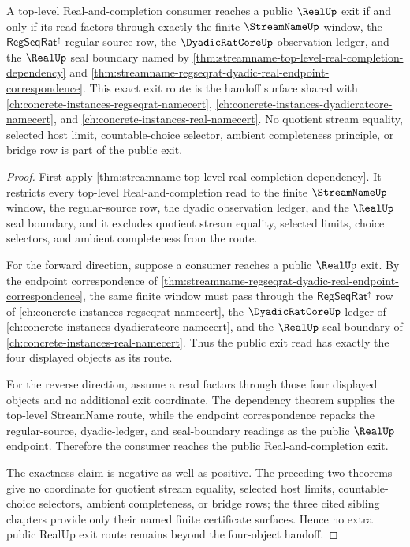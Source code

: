 \begin{theorem}
\label{thm:streamname-four-object-exit-exactness}
A top-level Real-and-completion consumer reaches a public $\RealUp$ exit if and only if its read factors through exactly the finite $\StreamNameUp$ window, the $\mathsf{RegSeqRat}^{\uparrow}$ regular-source row, the $\DyadicRatCoreUp$ observation ledger, and the $\RealUp$ seal boundary named by \autoref{thm:streamname-top-level-real-completion-dependency} and \autoref{thm:streamname-regseqrat-dyadic-real-endpoint-correspondence}. This exact exit route is the handoff surface shared with \autoref{ch:concrete-instances-regseqrat-namecert}, \autoref{ch:concrete-instances-dyadicratcore-namecert}, and \autoref{ch:concrete-instances-real-namecert}. No quotient stream equality, selected host limit, countable-choice selector, ambient completeness principle, or bridge row is part of the public exit.
\end{theorem}
\begin{proof}
First apply \autoref{thm:streamname-top-level-real-completion-dependency}. It restricts every top-level Real-and-completion read to the finite $\StreamNameUp$ window, the regular-source row, the dyadic observation ledger, and the $\RealUp$ seal boundary, and it excludes quotient stream equality, selected limits, choice selectors, and ambient completeness from the route.

For the forward direction, suppose a consumer reaches a public $\RealUp$ exit. By the endpoint correspondence of \autoref{thm:streamname-regseqrat-dyadic-real-endpoint-correspondence}, the same finite window must pass through the $\mathsf{RegSeqRat}^{\uparrow}$ row of \autoref{ch:concrete-instances-regseqrat-namecert}, the $\DyadicRatCoreUp$ ledger of \autoref{ch:concrete-instances-dyadicratcore-namecert}, and the $\RealUp$ seal boundary of \autoref{ch:concrete-instances-real-namecert}. Thus the public exit read has exactly the four displayed objects as its route.

For the reverse direction, assume a read factors through those four displayed objects and no additional exit coordinate. The dependency theorem supplies the top-level StreamName route, while the endpoint correspondence repacks the regular-source, dyadic-ledger, and seal-boundary readings as the public $\RealUp$ endpoint. Therefore the consumer reaches the public Real-and-completion exit.

The exactness claim is negative as well as positive. The preceding two theorems give no coordinate for quotient stream equality, selected host limits, countable-choice selectors, ambient completeness, or bridge rows; the three cited sibling chapters provide only their named finite certificate surfaces. Hence no extra public RealUp exit route remains beyond the four-object handoff.
\end{proof}

